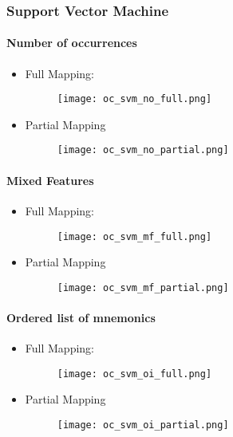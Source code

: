 \documentclass[a4paper]{article}
\begin{document}
\subsubsection{Support Vector Machine}
\paragraph{Number of occurrences}
\begin{itemize}
\item Full Mapping:
\begin{figure} [h!]
  \texttt{[image: oc\_svm\_no\_full.png]}
\end{figure}
\item Partial Mapping
\begin{figure} [h!]
  \texttt{[image: oc\_svm\_no\_partial.png]}
\end{figure}
\end{itemize}

\paragraph{Mixed Features}
\begin{itemize}
\item Full Mapping:
\begin{figure} [h!]
  \texttt{[image: oc\_svm\_mf\_full.png]}
\end{figure}
\item Partial Mapping
\begin{figure} [h!]
  \texttt{[image: oc\_svm\_mf\_partial.png]}
\end{figure}
\end{itemize}

\newpage
\paragraph{Ordered list of mnemonics}
\begin{itemize}
\item Full Mapping:
\begin{figure} [h!]
  \texttt{[image: oc\_svm\_oi\_full.png]}
\end{figure}
\item Partial Mapping
\begin{figure} [h!]
  \texttt{[image: oc\_svm\_oi\_partial.png]}
\end{figure}
\end{itemize}
\end{document}

